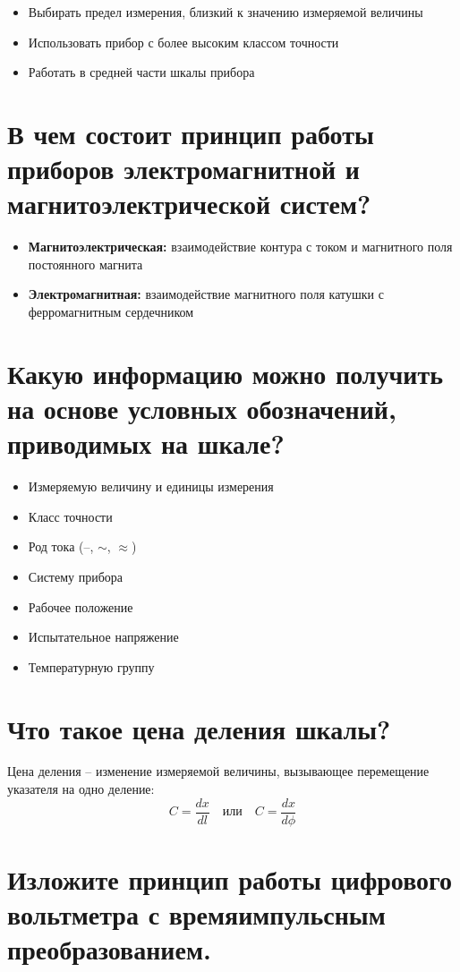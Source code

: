 \documentclass[14pt, a4paper, twoside]{extreport}
\begin{document}
\begin{itemize}
  \item Выбирать предел измерения, близкий к значению измеряемой величины
  \item Использовать прибор с более высоким классом точности
  \item Работать в средней части шкалы прибора
\end{itemize}

\section{В чем состоит принцип работы приборов электромагнитной и магнитоэлектрической систем?}

\begin{itemize}
  \item \textbf{Магнитоэлектрическая:} взаимодействие контура с током и магнитного поля постоянного магнита
  \item \textbf{Электромагнитная:} взаимодействие магнитного поля катушки с ферромагнитным сердечником
\end{itemize}

\section{Какую информацию можно получить на основе условных обозначений, приводимых на шкале?}

\begin{itemize}
  \item Измеряемую величину и единицы измерения
  \item Класс точности
  \item Род тока (--, $\sim$, $\approx$)
  \item Систему прибора
  \item Рабочее положение
  \item Испытательное напряжение
  \item Температурную группу
\end{itemize}

\section{Что такое цена деления шкалы?}

Цена деления -- изменение измеряемой величины, вызывающее перемещение указателя на одно деление:
\[
  C = \frac{dx}{dl} \quad \text{или} \quad C = \frac{dx}{d\phi}
\]

\section{Изложите принцип работы цифрового вольтметра с времяимпульсным преобразованием.}
\end{document}
